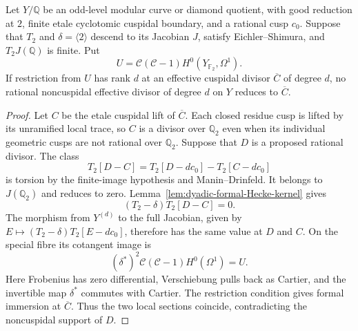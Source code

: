 \begin{lemma}\label{lem:decic77-finite-image-Cartier}
Let $Y/\mathbb Q$ be an odd-level modular curve or diamond quotient,
with good reduction at $2$, finite etale cyclotomic cuspidal
boundary, and a rational cusp $c_0$.
Suppose that $T_2$ and $\delta=\langle2\rangle$ descend to its
Jacobian $J$, satisfy Eichler--Shimura, and $T_2J(\mathbb Q)$ is
finite. Put
\[
 U=\mathcal C(\mathcal C-1)H^0(Y_{\mathbb F_2},\Omega^1).
\]
If restriction from $U$ has rank $d$ at an effective cuspidal
divisor $\overline C$ of degree $d$, no rational noncuspidal
effective divisor of degree $d$ on $Y$ reduces to $\overline C$.
\end{lemma}
\begin{proof}
Let $C$ be the etale cuspidal lift of $\overline C$.
Each closed residue cusp is lifted by its unramified local trace,
so $C$ is a divisor over $\mathbb Q_2$ even when its individual
geometric cusps are not rational over $\mathbb Q_2$.
Suppose that $D$ is a proposed rational divisor.
The class
\[
 T_2[D-C]=T_2[D-dc_0]-T_2[C-dc_0]
\]
is torsion by the finite-image hypothesis and Manin--Drinfeld.
It belongs to $J(\mathbb Q_2)$ and reduces to zero.
Lemma~\ref{lem:dyadic-formal-Hecke-kernel} gives
\[
 (T_2-\delta)T_2[D-C]=0.
\]
The morphism from $Y^{(d)}$ to the full Jacobian, given by
$E\mapsto(T_2-\delta)T_2[E-dc_0]$, therefore has the same value
at $D$ and $C$.
On the special fibre its cotangent image is
\[
 (\delta^*)^2\mathcal C(\mathcal C-1)H^0(\Omega^1)=U.
\]
Here Frobenius has zero differential, Verschiebung pulls back
as Cartier, and the invertible map $\delta^*$ commutes with Cartier.
The restriction condition gives formal immersion at $\overline C$.
Thus the two local sections coincide, contradicting the
noncuspidal support of $D$.
\end{proof}
